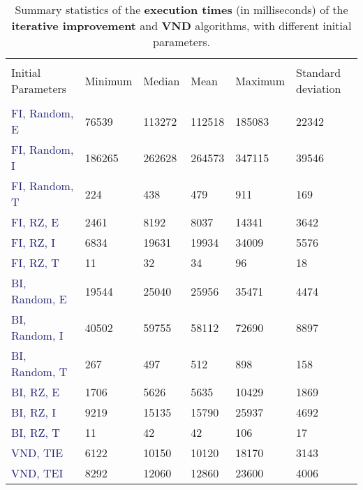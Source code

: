 \documentclass[
12pt,
a4paper,
oneside,
headinclude,
footinclude]{article}
\theoremstyle{definition} %
\begin{document}
    \begin{table}[H]
    \centering %
    \begin{tabular}{l l l l l l} %
        \hline
        \hline 
        \\[-1.5ex]
        \textcolor{BrickRed}{Initial Parameters} & \textcolor{BrickRed}{Minimum} & \textcolor{BrickRed}{Median} & \textcolor{BrickRed}{Mean} & \textcolor{BrickRed}{Maximum} & \textcolor{BrickRed}{Standard deviation}\\ [0.5ex]
        \hline %
        \\[-1.5ex]
        \textcolor{MidnightBlue}{FI, Random, E}     & 76539 & 113272 & 112518 & 185083 & 22342\\ 
        \textcolor{MidnightBlue}{FI, Random, I}     & 186265 & 262628 & 264573 & 347115 & 39546\\
        \textcolor{MidnightBlue}{FI, Random, T}     & 224 & 438 & 479 & 911 & 169\\
        \textcolor{MidnightBlue}{FI, RZ, E}         & 2461 & 8192 & 8037 & 14341 & 3642\\
        \textcolor{MidnightBlue}{FI, RZ, I}         & 6834  & 19631 & 19934 & 34009 & 5576\\
        \textcolor{MidnightBlue}{FI, RZ, T}         & 11 & 32 & 34 & 96 & 18\\
        \textcolor{MidnightBlue}{BI, Random, E}     & 19544 & 25040 & 25956 & 35471 & 4474\\
        \textcolor{MidnightBlue}{BI, Random, I}     & 40502 & 59755 & 58112 & 72690 & 8897\\
        \textcolor{MidnightBlue}{BI, Random, T}     & 267 & 497 & 512 & 898 & 158\\
        \textcolor{MidnightBlue}{BI, RZ, E}         & 1706 & 5626 & 5635 & 10429 & 1869\\
        \textcolor{MidnightBlue}{BI, RZ, I}         & 9219 & 15135 & 15790 & 25937 & 4692\\
        \textcolor{MidnightBlue}{BI, RZ, T}         & 11 & 42 & 42 & 106 & 17\\
        \textcolor{MidnightBlue}{VND, TIE}         & 6122    &   10150 &  10120   &   18170  & 3143\\
        \textcolor{MidnightBlue}{VND, TEI}         & 8292    &   12060 &  12860   &   23600  & 4006
        \\[1ex] %
        \hline %
    \end{tabular}
    \caption{\label{tab:100-exec}Summary statistics of the \textbf{execution times} (in milliseconds) of the \textbf{iterative improvement} and \textbf{VND} algorithms, with different initial parameters.}
    \end{table} 
\end{document}
